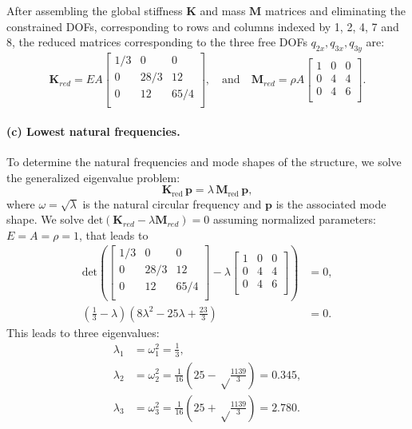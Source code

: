 \documentclass[12pt]{article}
\begin{document}
After assembling the global stiffness $\mathbf{K}$ and mass $\mathbf{M}$ matrices and eliminating the constrained DOFs, corresponding to rows and columns indexed by 1, 2, 4, 7 and 8, the reduced matrices corresponding to the three free DOFs $q_{2x}, q_{3x}, q_{3y}$ are:
\[
	\mathbf K_{red}=EA\begin{bmatrix}
		1/3 & 0    & 0    \\
		0   & 28/3 & 12   \\
		0   & 12   & 65/4 \\
	\end{bmatrix}, \quad\text{and}\quad
	\mathbf{M}_{red}=\rho A\begin{bmatrix}
		1 & 0 & 0 \\
		0 & 4 & 4 \\
		0 & 4 & 6 \\
	\end{bmatrix}.
\]

\paragraph*{(c) Lowest natural frequencies.} To determine the natural frequencies and mode shapes of the structure, we solve the generalized eigenvalue problem:
\[
	\mathbf{K}_{\text{red}} \, \mathbf{p} = \lambda\, \mathbf{M}_{\text{red}} \, \mathbf{p},
\]
where \( \omega=\sqrt{\lambda} \) is the natural circular frequency and \( \mathbf p \) is the associated mode shape. We solve $\text{det}\left(\mathbf{K}_{red}  - \lambda \mathbf{M}_{red}\right)=0$ assuming normalized parameters: \( E = A = \rho = 1 \), that leads to
\begin{align*}
	\text{det}\left(\begin{bmatrix}
			                1/3 & 0    & 0    \\
			                0   & 28/3 & 12   \\
			                0   & 12   & 65/4 \\
		                \end{bmatrix}-\lambda\begin{bmatrix}
			                                     1 & 0 & 0 \\
			                                     0 & 4 & 4 \\
			                                     0 & 4 & 6 \\
		                                     \end{bmatrix}\right)                                                  & =0, \\
	\left(\frac{1}{3}-\lambda\right)\left(8 \lambda^2 - 25 \lambda + \frac{23}{3} \right) & = 0.
\end{align*}
This leads to three eigenvalues:
\begin{align*}
	\lambda_1 & = \omega_1^2 = \frac{1}{3},                                           \\
	\lambda_2 & = \omega_2^2 = \frac{1}{16}\left(25-\sqrt\frac{1139}{3}\right)=0.345, \\
	\lambda_3 & = \omega_3^2 = \frac{1}{16}\left(25+\sqrt\frac{1139}{3}\right)=2.780.
\end{align*}
\end{document}

